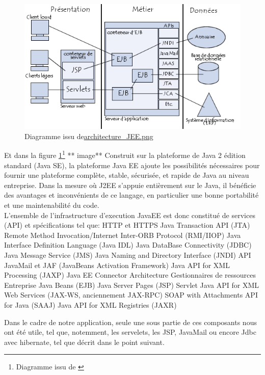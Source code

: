 \begin{figure}[!h]
    \center
   	\includegraphics[scale=0.65]{architecture_JEE.png}
   	\caption{Diagramme issu de\url{architecture_JEE.png}}
    \label{reference1}
\end{figure}

Et dans la figure  \ref{reference1}\footnote{Diagramme issu de \url{}}
** image**
Construit sur la plateforme de Java 2 édition standard (Java SE), la plateforme Java EE ajoute les possibilités nécessaires pour fournir une plateforme complète, stable, sécurisée, et rapide de Java au niveau entreprise. 
Dans la mesure où J2EE s'appuie entièrement sur le Java, il bénéficie des avantages et inconvénients de ce langage, en particulier une bonne portabilité et une maintenabilité du code.\\
\newline
\indent
L'ensemble de l'infrastructure d'execution JavaEE est donc constitué de services (API) et spécifications tel que:
HTTP et HTTPS
Java Transaction API (JTA)
Remote Method Invocation/Internet Inter-ORB Protocol (RMI/IIOP)
Java Interface Definition Language (Java IDL)
Java DataBase Connectivity (JDBC)
Java Message Service (JMS)
Java Naming and Directory Interface (JNDI)
API JavaMail et JAF (JavaBeans Activation Framework)
Java API for XML Processing (JAXP)
Java EE Connector Architecture
Gestionnaires de ressources
Entreprise Java Beans (EJB)
Java Server Pages (JSP)
Servlet
Java API for XML Web Services (JAX-WS, anciennement JAX-RPC)
SOAP with Attachments API for Java (SAAJ)
Java API for XML Registries (JAXR)

Dans le cadre de notre application, seule une sous partie de ces composants nous ont été utile, tel que, notemment, les servelets, les JSP, JavaMail ou encore Jdbc avec hibernate, tel que décrit dans le point suivant.

